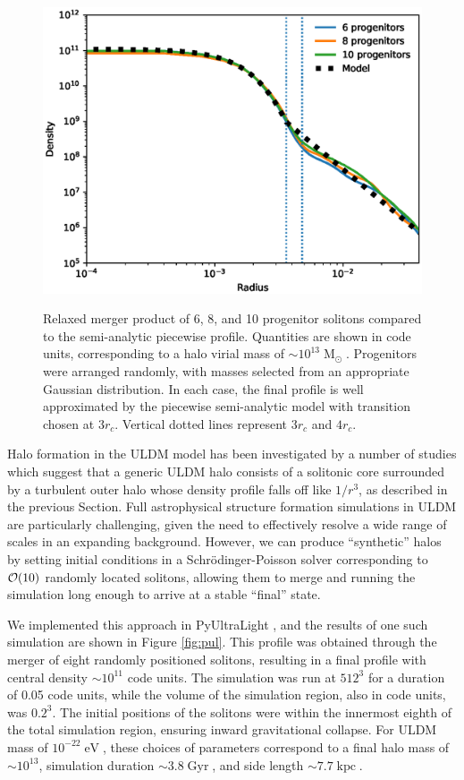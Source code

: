 \documentclass[a4paper,11pt]{article}
\begin{document}
\begin{figure}
\centering
{\includegraphics[scale = 0.7, trim={1cm 0cm 1cm 0.35cm}]{pics/progenitors.eps}} 
\caption{Relaxed merger product of 6, 8, and 10 progenitor solitons compared to the semi-analytic piecewise profile. Quantities are shown in code units, corresponding to a halo virial mass of $\sim 10^{13}\operatorname{M}_{\odot}$.  Progenitors were arranged randomly, with masses selected from an appropriate Gaussian distribution. In each case, the final profile is well approximated by the piecewise semi-analytic model with transition chosen at $3 r_c$. Vertical dotted lines represent $3r_c$ and $4r_c$.  }\label{fig:validity}
\end{figure}


Halo formation in the ULDM model has been investigated by a number of studies \cite{Schwabe:2016rze, Mocz:2017wlg, Lin:2018whl} which suggest that a generic ULDM halo consists of a solitonic core surrounded by a turbulent outer halo whose density profile falls off like $1/r^3$, as described in the previous Section. Full astrophysical structure formation simulations in ULDM are particularly challenging, given the need to effectively resolve a wide range of scales in an expanding background. However, we can produce ``synthetic'' halos by setting initial conditions in a Schr{\"o}dinger-Poisson  solver corresponding to ${\cal{O}}(10)$ randomly located solitons, allowing them to merge and running the simulation long enough to arrive at a stable ``final'' state. 

We  implemented this approach in {\sc PyUltraLight}  \cite{Edwards:2018ccc}, and the results of one such simulation are shown in Figure \ref{fig:pul}. This profile was obtained through the merger of eight randomly positioned solitons, resulting in a final profile with central density $\sim 10^{11}$ code units.
The simulation was run at $512^3$ for a duration of 0.05 code units, while the volume of the simulation region, also in code units, was $0.2^3$. The initial positions of the solitons were within the innermost eighth of the total simulation region, ensuring inward gravitational collapse. For ULDM  mass of $10^{-22}\operatorname{eV}$, these choices of parameters correspond to a final halo mass of $\sim 10^{13}$, simulation duration $\sim 3.8 \operatorname{Gyr}$, and side length $\sim 7.7 \operatorname{kpc}$. 
\end{document}
